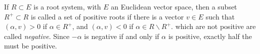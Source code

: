 \documentclass[12pt]{article}
\begin{document}
If $R\subset E$ is a root system, with $E$ an Euclidean vector space, then a subset 
$R^+\subset R$ is called a set of positive roots if there is a vector $v\in E$ such that
$(\alpha ,v)>0$ if $\alpha\in R^+$, and $(\alpha ,v)<0$ if $\alpha\in R\backslash R^+$.
 which are not positive are called \emph{negative}.  Since $-\alpha$ is negative if and only if
$\alpha$ is positive, exactly half the  must be positive.
\end{document}

